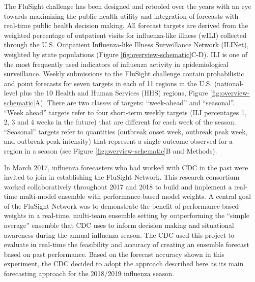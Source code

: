 \documentclass{article}\usepackage[]{graphicx}\usepackage[]{color}
\begin{document}
The FluSight challenge has been designed and retooled over the years with an eye towards maximizing the public health utility and integration of forecasts with real-time public health decision making.
All forecast targets are derived from the weighted percentage of outpatient visits for influenza-like illness (wILI) collected through the U.S. Outpatient Influenza-like Illness Surveillance Network (ILINet), weighted by state populations (Figure \ref{fig:overview-schematic}C-D).
ILI is one of the most frequently used indicators of influenza activity in epidemiological surveillance. 
Weekly submissions to the FluSight challenge contain probabilistic and point forecasts for seven targets in each of 11 regions in the U.S. (national-level plus the 10 Health and Human Services (HHS) regions, Figure \ref{fig:overview-schematic}A).
There are two classes of targets: ``week-ahead'' and ``seasonal''.
``Week ahead'' targets refer to four short-term weekly targets (ILI percentages 1, 2, 3 and 4 weeks in the future) that are different for each week of the season.
``Seasonal'' targets refer to quantities (outbreak onset week, outbreak peak week, and outbreak peak intensity) that represent a single outcome observed for a region in a season (see Figure \ref{fig:overview-schematic}B and Methods). 

In March 2017, influenza forecasters who had worked with CDC in the past were invited to join in establishing the FluSight Network.
This research consortium worked collaboratively throughout 2017 and 2018 to build and implement a real-time multi-model ensemble with performance-based model weights.
A central goal of the FluSight Network was to demonstrate the benefit of performance-based weights in a real-time, multi-team ensemble setting by outperforming the ``simple average'' ensemble that CDC uses to inform decision making and situational awareness during the annual influenza season. 
The CDC used this project to evaluate in real-time the feasibility and accuracy of creating an ensemble forecast based on past performance. 
Based on the forecast accuracy shown in this experiment, the CDC decided to adopt the approach described here as its main forecasting approach for the 2018/2019 influenza season. 
\end{document}
